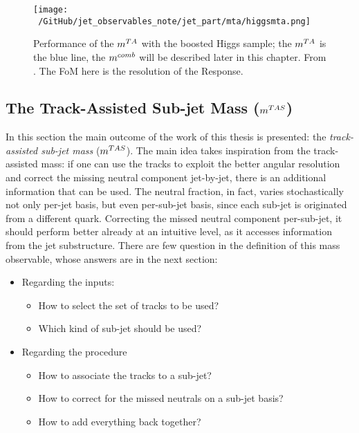 \begin{figure}[!ht]
  \centering
      \texttt{[image: ~/GitHub/jet\_observables\_note/jet\_part/mta/higgsmta.png]}
  \caption[Performance of the $\mta$ with the boosted Higgs sample]{Performance of the $\mta$ with the boosted Higgs sample; the $\mta$ is the blue line, the $m^{comb}$ will be described later in this chapter. From \cite{art39}. The FoM here is the resolution of the Response.}
  \label{fig:mta4}
\end{figure}



\subsection{The Track-Assisted Sub-jet Mass ($m^{TAS}$)}
In this section the main outcome of the work of this thesis is presented: the \textit{track-assisted sub-jet mass} ($m^{TAS}$).
The main idea takes inspiration from the track-assisted mass: if one can use the tracks to exploit the better angular resolution and correct the missing neutral component jet-by-jet, there is an additional information that can be used. The neutral fraction, in fact, varies stochastically not only per-jet basis, but even per-sub-jet basis, since each sub-jet is originated from a different quark.
Correcting the missed neutral component per-sub-jet, it should perform better already at an intuitive level, as it accesses information from the jet substructure.
There are few question in the definition of this mass observable, whose answers are in the next section:
\begin{itemize}
  \item Regarding the inputs:
  \begin{itemize}
     \item How to select the set of tracks to be used?
     \item Which kind of sub-jet should be used?
  \end{itemize}
  \item Regarding the procedure
  \begin{itemize}
  
  \item How to associate the tracks to a sub-jet?
  \item How to correct for the missed neutrals on a sub-jet basis?
  \item How to add everything back together?
 \end{itemize} 
 
\end{itemize}

